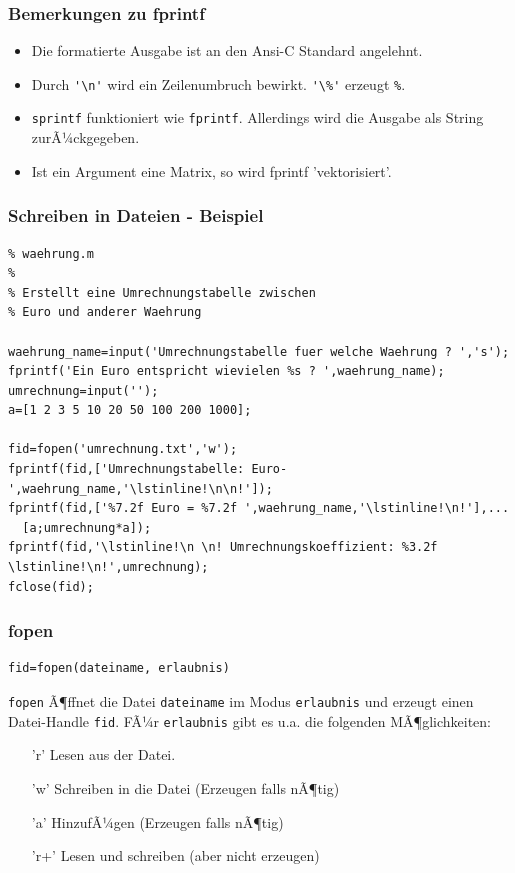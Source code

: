 %
%
\begin{frame}[fragile]\frametitle{Bemerkungen zu fprintf}
\begin{itemize} 
\item Die formatierte Ausgabe ist an den Ansi-C Standard angelehnt.
\item Durch \lstinline!'\n'! wird ein Zeilenumbruch bewirkt. \lstinline!'\%'! erzeugt
  \lstinline!%!.
 \item \lstinline!sprintf! funktioniert wie \lstinline!fprintf!. Allerdings wird
  die Ausgabe als String zurÃ¼ckgegeben. 
\item Ist ein Argument eine Matrix, so wird fprintf 'vektorisiert'.
\end{itemize}
\end{frame}
%
%
\begin{frame}[fragile]\frametitle{Schreiben in Dateien - Beispiel}
\begin{lstlisting}
% waehrung.m
% 
% Erstellt eine Umrechnungstabelle zwischen 
% Euro und anderer Waehrung

waehrung_name=input('Umrechnungstabelle fuer welche Waehrung ? ','s');
fprintf('Ein Euro entspricht wievielen %s ? ',waehrung_name);
umrechnung=input('');
a=[1 2 3 5 10 20 50 100 200 1000];

fid=fopen('umrechnung.txt','w');
fprintf(fid,['Umrechnungstabelle: Euro-',waehrung_name,'\lstinline!\n\n!']);
fprintf(fid,['%7.2f Euro = %7.2f ',waehrung_name,'\lstinline!\n!'],...
  [a;umrechnung*a]);
fprintf(fid,'\lstinline!\n \n! Umrechnungskoeffizient: %3.2f \lstinline!\n!',umrechnung); 
fclose(fid);
\end{lstlisting}
\end{frame}
%
%
\begin{frame}[fragile]\frametitle{fopen}
\begin{lstlisting}
fid=fopen(dateiname, erlaubnis)
\end{lstlisting}

\lstinline!fopen! Ã¶ffnet die Datei \lstinline!dateiname! im Modus
  \lstinline!erlaubnis! und erzeugt einen
  Datei-Handle \lstinline!fid!. FÃ¼r \lstinline!erlaubnis! gibt es u.a. die folgenden
  MÃ¶glichkeiten:
{%
\begin{itemize}
\item ['r']  Lesen aus der Datei.
\item ['w']  Schreiben in die Datei (Erzeugen falls nÃ¶tig)
\item ['a']  HinzufÃ¼gen (Erzeugen falls nÃ¶tig)
\item ['r+'] Lesen und schreiben (aber nicht erzeugen) 
\end{itemize}
}
\end{frame}
